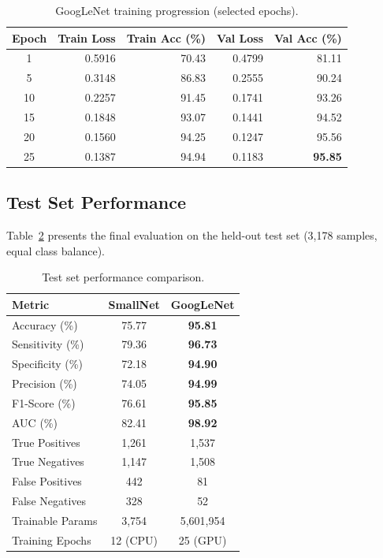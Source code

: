 \documentclass[12pt,a4paper]{article}
\begin{document}
\begin{table}[H]
\centering
\caption{GoogLeNet training progression (selected epochs).}
\label{tab:googlenet_hist}
\begin{tabular}{crrrr}
    \toprule
    \textbf{Epoch} & \textbf{Train Loss} & \textbf{Train Acc (\%)} &
    \textbf{Val Loss} & \textbf{Val Acc (\%)} \\
    \midrule
    1  & 0.5916 & 70.43 & 0.4799 & 81.11 \\
    5  & 0.3148 & 86.83 & 0.2555 & 90.24 \\
    10 & 0.2257 & 91.45 & 0.1741 & 93.26 \\
    15 & 0.1848 & 93.07 & 0.1441 & 94.52 \\
    20 & 0.1560 & 94.25 & 0.1247 & 95.56 \\
    25 & 0.1387 & 94.94 & 0.1183 & \textbf{95.85} \\
    \bottomrule
\end{tabular}
\end{table}

\subsection{Test Set Performance}

Table~\ref{tab:results} presents the final evaluation on the held-out test set
(3,178 samples, equal class balance).

\begin{table}[H]
\centering
\caption{Test set performance comparison.}
\label{tab:results}
\begin{tabular}{lcc}
    \toprule
    \textbf{Metric} & \textbf{SmallNet} & \textbf{GoogLeNet} \\
    \midrule
    Accuracy (\%)    & 75.77 & \textbf{95.81} \\
    Sensitivity (\%) & 79.36 & \textbf{96.73} \\
    Specificity (\%) & 72.18 & \textbf{94.90} \\
    Precision (\%)   & 74.05 & \textbf{94.99} \\
    F1-Score (\%)    & 76.61 & \textbf{95.85} \\
    AUC (\%)         & 82.41 & \textbf{98.92} \\
    \midrule
    True Positives   & 1,261 & 1,537 \\
    True Negatives   & 1,147 & 1,508 \\
    False Positives  & 442   & 81 \\
    False Negatives  & 328   & 52 \\
    \midrule
    Trainable Params & 3,754 & 5,601,954 \\
    Training Epochs  & 12 (CPU) & 25 (GPU) \\
    \bottomrule
\end{tabular}
\end{table}
\end{document}
